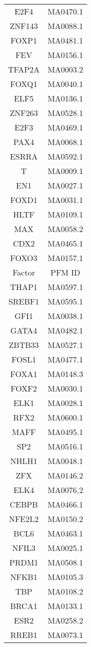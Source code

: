 \begin{multicols}{3}
{{\begin{longtable}{cc}
E2F4 & MA0470.1\\
ZNF143 & MA0088.1\\
FOXP1 & MA0481.1\\
FEV & MA0156.1\\
TFAP2A & MA0003.2\\
FOXQ1 & MA0040.1\\
ELF5 & MA0136.1\\
ZNF263 & MA0528.1\\
E2F3 & MA0469.1\\
PAX4 & MA0068.1\\
ESRRA & MA0592.1\\
T & MA0009.1\\
EN1 & MA0027.1\\
FOXD1 & MA0031.1\\
HLTF & MA0109.1\\
MAX & MA0058.2\\
CDX2 & MA0465.1\\
FOXO3 & MA0157.1\\
        \hline
Factor & PFM ID\\
        \hline
THAP1 & MA0597.1\\
SREBF1 & MA0595.1\\
GFI1 & MA0038.1\\
GATA4 & MA0482.1\\
ZBTB33 & MA0527.1\\
FOSL1 & MA0477.1\\
FOXA1 & MA0148.3\\
FOXF2 & MA0030.1\\
ELK1 & MA0028.1\\
RFX2 & MA0600.1\\
MAFF & MA0495.1\\
SP2 & MA0516.1\\
NHLH1 & MA0048.1\\
ZFX & MA0146.2\\
ELK4 & MA0076.2\\
CEBPB & MA0466.1\\
NFE2L2 & MA0150.2\\
BCL6 & MA0463.1\\
NFIL3 & MA0025.1\\
PRDM1 & MA0508.1\\
NFKB1 & MA0105.3\\
TBP & MA0108.2\\
BRCA1 & MA0133.1\\
ESR2 & MA0258.2\\
RREB1 & MA0073.1\\

\end{longtable}}}
\end{multicols}
